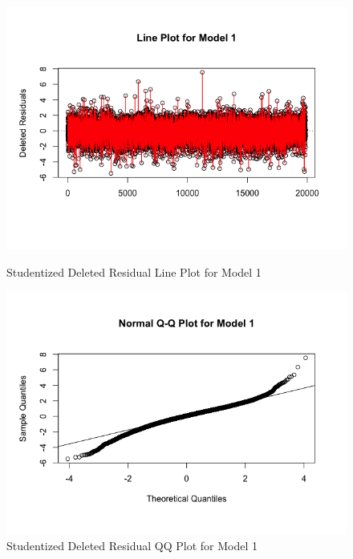 \documentclass{article}
\begin{document}
\begin{figure}[H]
\begin{minipage}{.45\textwidth}
          \includegraphics[scale=0.35]{selection/linem1}
          \caption{Studentized Deleted Residual Line Plot for Model 1}
          \label{fig:linem1}
        \end{minipage}
        \begin{minipage}{.45\textwidth}
          \centering
          \includegraphics[scale=0.35]{selection/qqm1}
          \caption{Studentized Deleted Residual QQ Plot for Model 1}
          \label{fig:qqm1}


\end{minipage}
\end{figure}
\end{document}
